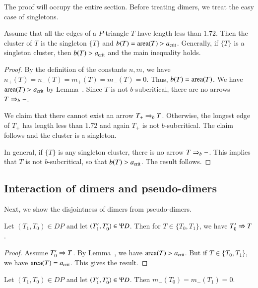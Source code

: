 The proof will occupy the entire section.  Before treating dimers, we
treat the easy case of singletons.

\begin{lemma}  
  Assume that all the edges of a $P$-triangle $T$ have length less
  than $1.72$.  Then the cluster of $T$ is the singleton $\{T\}$ and
  $b(T) ={\operatorname{area}}(T) > a_\text{crit}$.  Generally, if $\{T\}$ is a singleton
  cluster, then $b(T) > a_\text{crit}$ and the main inequality holds.
\end{lemma}

\begin{proof}  
  By the definition of the constants $n,m$, we have $n_+(T)=n_-(T) =
  m_+(T)=m_-(T)=0$.  Thus, $b(T)={\operatorname{area}}(T)$.  We have ${\operatorname{area}}(T) >
  a_\text{crit}$ by Lemma~.  Since $T$ is not $b$-subcritical,
  there are no arrows $T\Rightarrow_{b} -$.

  We claim that there cannot exist an arrow $T_+\Rightarrow_{b} T$.  Otherwise,
  the longest edge of $T_+$ has length less than $1.72$ and again
  $T_+$ is not $b$-subcritical.  The claim follows and the cluster is
  a singleton.

  In general, if $\{T\}$ is any singleton cluster, there is no arrow
  $T\Rightarrow_{b} -$.  This implies that $T$ is not $b$-subcritical, so that
  $b(T) > a_\text{crit}$.  The result follows.
\end{proof}

\subsection{Interaction of dimers and pseudo-dimers}

Next, we show the disjointness of dimers from pseudo-dimers.

\begin{lemma}\label{lemma:pd-nra-dimer}
  Let $(T_1,T_0)\in DP$ and let $(T'_1,T'_0)\in\Psi D$.  Then for
  $T\in\{T_0,T_1\}$, we have $T'_0\nRightarrow T$.
\end{lemma}

\begin{proof} 
  Assume $T'_0\Rightarrow T$.  By Lemma~, we have
  ${\operatorname{area}}(T)>a_\text{crit}$.  But if $T\in\{T_0,T_1\}$, we have
  ${\operatorname{area}}(T)=a_\text{crit}$.  This gives the result.
\end{proof}

\begin{lemma}  
  Let $(T_1,T_0)\in DP$ and let $(T'_1,T'_0)\in \Psi D$.  Then
  $m_-(T_0)=m_-(T_1)=0$.
\end{lemma}

